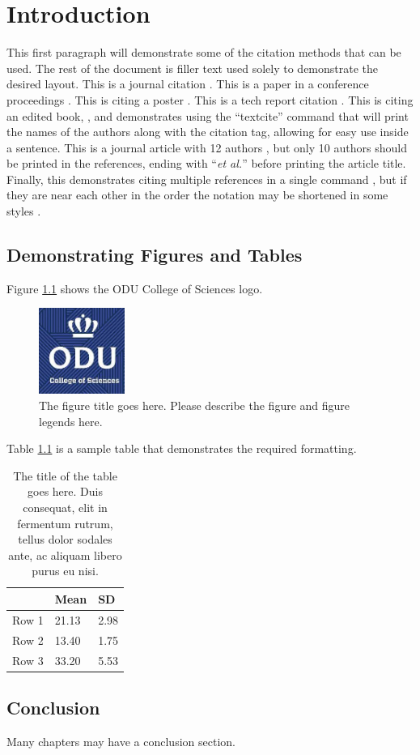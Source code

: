 \chapter{Introduction} 
This first paragraph will demonstrate some of the citation methods that can be used. The rest of the document is filler text used solely to demonstrate the desired layout.  This is a journal citation \autocite{berlin-tweb23}. This is a paper in a conference proceedings \autocite{weigle-jcdl23}. This is citing a poster \autocite{jayanetti-sbp23}. This is a tech report citation \autocite{weigle-2023}. This is citing an edited book, \textcite{vanet-book}, and demonstrates using the ``textcite'' command that will print the names of the authors along with the citation tag, allowing for easy use inside a sentence.  This is a journal article with 12 authors \autocite{coifman2005geometric}, but only 10 authors should be printed in the references, ending with ``\emph{et al.}'' before printing the article title.  Finally, this  demonstrates citing multiple references in a single command \autocites{jones-memento21,vanet-book,weigle-jcdl23}, but if they are near each other in the order the notation may be shortened in some styles \autocites{berlin-tweb23, weigle-jcdl23, jayanetti-sbp23}.

\section{Demonstrating Figures and Tables}
Figure \ref{fig:cos1} shows the ODU College of Sciences logo.
\begin{figure}[tbh]
  \centering
  \includegraphics[width=0.25\textwidth]{Figures/cos1.jpeg}
  \caption[The figure title goes here.]{The figure title goes here. Please describe the figure and figure legends here.}
  \label{fig:cos1}
\end{figure}

Table \ref{tab:table_example1} is a sample table that demonstrates the required formatting.
\begin{table}[tbh]
\caption[The title of the table goes here. Duis consequat, elit in fermentum rutrum, tellus dolor sodales ante, ac aliquam libero purus eu nisi.]{The title of the table goes here. Duis consequat, elit in fermentum rutrum, tellus dolor sodales ante, ac aliquam libero purus eu nisi.}
\label{tab:table_example1}
\begin{center}
\begin{tabular}{lll}
      & Mean  & SD   \\ \hline
Row 1 & 21.13 & 2.98 \\ 
Row 2 & 13.40 & 1.75 \\ 
Row 3 & 33.20 & 5.53 \\ \hline
\end{tabular}
\end{center}
\end{table}

\section{Conclusion}
Many chapters may have a conclusion section.